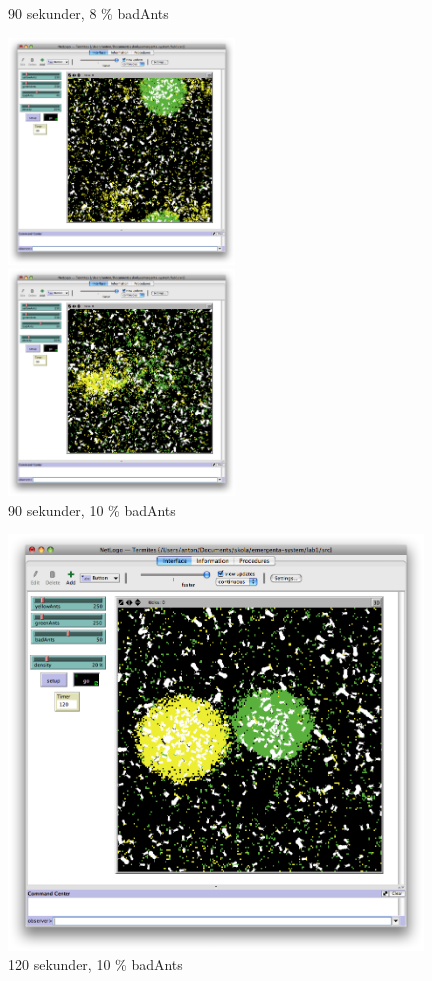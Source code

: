 \documentclass[titlepage, a4paper, 12pt]{article}
\begin{document}
\begin{figure}
  \begin{minipage}[b]{0.5\linewidth} %
    \centering
    \caption{90 sekunder, 8 \% badAnts}
    \includegraphics[width=6cm]{images/40-bad-90.png}
  \end{minipage}
  \hspace{0.5cm} %
  \begin{minipage}[b]{0.5\linewidth}
    \centering
    \caption{90 sekunder, 10 \% badAnts}
    \includegraphics[width=6cm]{images/50-bad-90.png}
  \end{minipage}
\end{figure}

\begin{figure}
  \begin{center}
    \includegraphics[width=110mm]{images/50-bad-120.png}
    \caption{120 sekunder, 10 \% badAnts}
  \end{center}
\end{figure}
\end{document}
